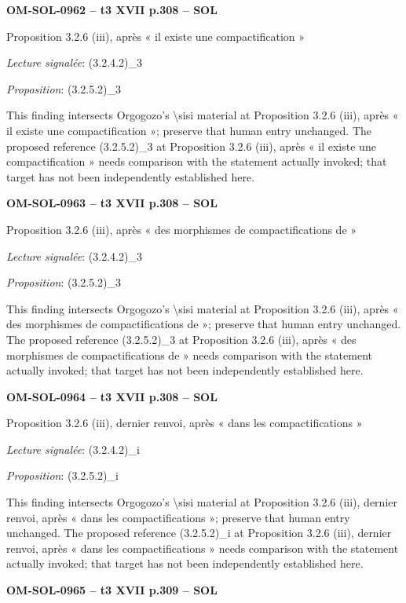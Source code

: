 \par\noindent\textbf{OM-SOL-0962 -- t3 XVII p.308 -- SOL}\par
Proposition 3.2.6 (iii), après « il existe une compactification »\par
\emph{Lecture signalée}: (3.2.4.2)\_3\par
\emph{Proposition}: (3.2.5.2)\_3\par
This finding intersects Orgogozo's \textbackslash{}sisi material at Proposition 3.2.6 (iii), après « il existe une compactification »; preserve that human entry unchanged. The proposed reference (3.2.5.2)\_3 at Proposition 3.2.6 (iii), après « il existe une compactification » needs comparison with the statement actually invoked; that target has not been independently established here.\par
\par\noindent\textbf{OM-SOL-0963 -- t3 XVII p.308 -- SOL}\par
Proposition 3.2.6 (iii), après « des morphismes de compactifications de »\par
\emph{Lecture signalée}: (3.2.4.2)\_3\par
\emph{Proposition}: (3.2.5.2)\_3\par
This finding intersects Orgogozo's \textbackslash{}sisi material at Proposition 3.2.6 (iii), après « des morphismes de compactifications de »; preserve that human entry unchanged. The proposed reference (3.2.5.2)\_3 at Proposition 3.2.6 (iii), après « des morphismes de compactifications de » needs comparison with the statement actually invoked; that target has not been independently established here.\par
\par\noindent\textbf{OM-SOL-0964 -- t3 XVII p.308 -- SOL}\par
Proposition 3.2.6 (iii), dernier renvoi, après « dans les compactifications »\par
\emph{Lecture signalée}: (3.2.4.2)\_i\par
\emph{Proposition}: (3.2.5.2)\_i\par
This finding intersects Orgogozo's \textbackslash{}sisi material at Proposition 3.2.6 (iii), dernier renvoi, après « dans les compactifications »; preserve that human entry unchanged. The proposed reference (3.2.5.2)\_i at Proposition 3.2.6 (iii), dernier renvoi, après « dans les compactifications » needs comparison with the statement actually invoked; that target has not been independently established here.\par
\par\noindent\textbf{OM-SOL-0965 -- t3 XVII p.309 -- SOL}\par
